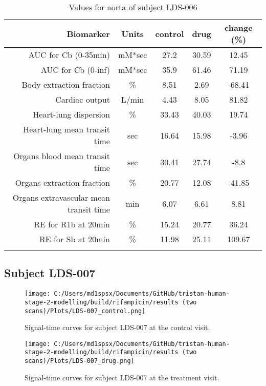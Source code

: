 \documentclass{epflreport}%
\begin{document}
\begin{longtable}{rcccc}%
\hline%
Biomarker&Units&control&drug&change (\%)\\%
\hline%
AUC for Cb (0{-}35min)&mM*sec&27.2&30.59&12.45\\%
AUC for Cb (0{-}inf)&mM*sec&35.9&61.46&71.19\\%
Body extraction fraction&\%&8.51&2.69&{-}68.41\\%
Cardiac output&L/min&4.43&8.05&81.82\\%
Heart{-}lung dispersion&\%&33.43&40.03&19.74\\%
Heart{-}lung mean transit time&sec&16.64&15.98&{-}3.96\\%
Organs blood mean transit time&sec&30.41&27.74&{-}8.8\\%
Organs extraction fraction&\%&20.77&12.08&{-}41.85\\%
Organs extravascular mean transit time&min&6.07&6.61&8.81\\%
RE for R1b at 20min&\%&15.24&20.77&36.24\\%
RE for Sb at 20min&\%&11.98&25.11&109.67\\%
\hline%
\caption{Values for aorta of subject LDS-006} \\%
\end{longtable}%
\clearpage%
\subsection{Subject LDS{-}007}%
\label{subsec:SubjectLDS{-}007}%

%


\begin{figure}[h!]%
\centering%
\texttt{[image: C:/Users/md1spsx/Documents/GitHub/tristan-human-stage-2-modelling/build/rifampicin/results (two scans)/Plots/LDS-007\_control.png]}%
\caption{Signal{-}time curves for subject LDS{-}007 at the control visit.}%
\end{figure}

%


\begin{figure}[h!]%
\centering%
\texttt{[image: C:/Users/md1spsx/Documents/GitHub/tristan-human-stage-2-modelling/build/rifampicin/results (two scans)/Plots/LDS-007\_drug.png]}%
\caption{Signal{-}time curves for subject LDS{-}007 at the treatment visit.}%
\end{figure}
\end{document}
